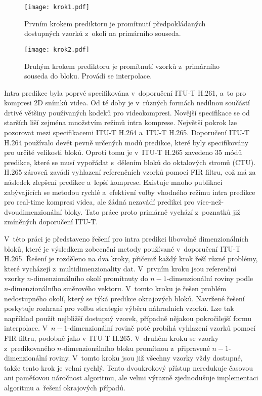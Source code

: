 \begin{figure}[htbp]\centering
  \centering
  \texttt{[image: krok1.pdf]}%
  \caption{Prvním krokem pre\-diktoru je promítnutí předpokládaných dostupných vzorků z~okolí na pri\-már\-ního souseda.}
  \label{fig:krok1}
\end{figure}

\begin{figure}[htbp]\centering
  \centering
  \texttt{[image: krok2.pdf]}%
  \caption{Druhým krokem pre\-diktoru je promítnutí vzorků z~pri\-már\-ního souseda do bloku. Provádí se interpolace.}
  \label{fig:krok2}
\end{figure}


Intra pre\-dikce byla poprvé specifikována v~doporučení ITU-T H.261, a~to pro kom\-pre\-si 2D snímků videa.
Od té doby je v~různých formách nedílnou součástí drtivé většiny používaných kodeků pro vi\-deo\-kom\-pre\-si.
Novější specifikace se od starších liší zejména množstvím režimů intra kom\-pre\-se.
Největší pokrok lze pozorovat mezi specifikacemi ITU-T H.264 a~ITU-T H.265.
Doporučení ITU-T H.264 používalo devět pevně určených modů pre\-dikce, které byly specifikovány pro určité velikosti bloků.
Oproti tomu je v~ITU-T H.265 zavedeno 35 módů pre\-dikce, které se musí vypořádat s~dělením bloků do oktalových stromů (CTU).
H.265 zároveň zavádí vyhlazení referenčních vzorků pomocí FIR filtru, což má za následek zlepšení pre\-dikce a~lepší kom\-pre\-se.
Existuje mnoho publikací zabývajících se me\-to\-dou rychlé a~efektivní volby vhodného režimu intra pre\-dikce pro real-time kom\-pre\-si videa, ale žádná nezavádí pre\-dikci pro více-než-dvoudimenzionální bloky.
Tato práce proto pri\-már\-ně vychází z~poznatků již zmíněných doporučení ITU-T.

V~této práci je představeno řešení pro intra pre\-dikci libovolně dimenzionálních bloků, které je výsledkem zobecnění me\-to\-dy používané v~doporučení ITU-T H.265.
Řešení je rozděleno na dva kroky, přičemž každý krok řeší různé problémy, které vycházejí z~multidimenzionality dat.
V~prvním kroku jsou referenční vzorky $n$-dimenzionálního okolí promítnuty do $n-1$-dimenzionální roviny podle $n$-dimenzionálního směr\-ového vektoru.
V~tomto kroku je řešen problém nedostupného okolí, který se týká pre\-dikce okrajových bloků.
Navržené řešení poskytuje rozhraní pro volbu strategie výběru náhradních vzorků. Lze tak například použít nejbližší dostupný vzorek, případně nějakou pokročilejší formu interpolace.
V~$n-1$-dimenzionální rovině poté probíhá vyhlazení vzorků pomocí FIR filtru, podobně jako v~ITU-T H.265.
V~druhém kroku se vzorky z~pre\-dikovaného $n$-dimenzionálního bloku promítnou z~připravené $n-1$-dimenzionální roviny.
V~tomto kroku jsou již všechny vzorky vždy dostupné, takže tento krok je velmi rychlý.
Tento dvoukrokový přístup neredukuje časovou ani paměťovou náročnost algoritmu, ale velmi výrazně zjednodušuje implementaci algoritmu a~řešení okrajových případů.


